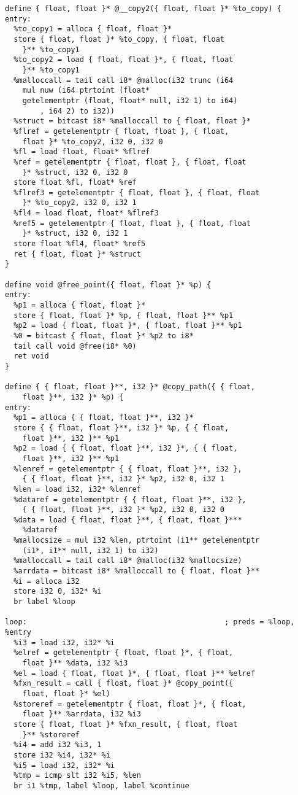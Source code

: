 \documentclass[main.tex]{subfiles}
\begin{document}
{\begin{lstlisting}
define { float, float }* @__copy2({ float, float }* %to_copy) {
entry:
  %to_copy1 = alloca { float, float }*
  store { float, float }* %to_copy, { float, float
    }** %to_copy1
  %to_copy2 = load { float, float }*, { float, float
    }** %to_copy1
  %malloccall = tail call i8* @malloc(i32 trunc (i64
    mul nuw (i64 ptrtoint (float* 
    getelementptr (float, float* null, i32 1) to i64)
        , i64 2) to i32))
  %struct = bitcast i8* %malloccall to { float, float }*
  %flref = getelementptr { float, float }, { float, 
    float }* %to_copy2, i32 0, i32 0
  %fl = load float, float* %flref
  %ref = getelementptr { float, float }, { float, float
    }* %struct, i32 0, i32 0
  store float %fl, float* %ref
  %flref3 = getelementptr { float, float }, { float, float
    }* %to_copy2, i32 0, i32 1
  %fl4 = load float, float* %flref3
  %ref5 = getelementptr { float, float }, { float, float
    }* %struct, i32 0, i32 1
  store float %fl4, float* %ref5
  ret { float, float }* %struct
}

define void @free_point({ float, float }* %p) {
entry:
  %p1 = alloca { float, float }*
  store { float, float }* %p, { float, float }** %p1
  %p2 = load { float, float }*, { float, float }** %p1
  %0 = bitcast { float, float }* %p2 to i8*
  tail call void @free(i8* %0)
  ret void
}

define { { float, float }**, i32 }* @copy_path({ { float,
    float }**, i32 }* %p) {
entry:
  %p1 = alloca { { float, float }**, i32 }*
  store { { float, float }**, i32 }* %p, { { float, 
    float }**, i32 }** %p1
  %p2 = load { { float, float }**, i32 }*, { { float,
    float }**, i32 }** %p1
  %lenref = getelementptr { { float, float }**, i32 },
    { { float, float }**, i32 }* %p2, i32 0, i32 1
  %len = load i32, i32* %lenref
  %dataref = getelementptr { { float, float }**, i32 },
    { { float, float }**, i32 }* %p2, i32 0, i32 0
  %data = load { float, float }**, { float, float }***
    %dataref
  %mallocsize = mul i32 %len, ptrtoint (i1** getelementptr
    (i1*, i1** null, i32 1) to i32)
  %malloccall = tail call i8* @malloc(i32 %mallocsize)
  %arrdata = bitcast i8* %malloccall to { float, float }**
  %i = alloca i32
  store i32 0, i32* %i
  br label %loop

loop:                                             ; preds = %loop, %entry
  %i3 = load i32, i32* %i
  %elref = getelementptr { float, float }*, { float,
    float }** %data, i32 %i3
  %el = load { float, float }*, { float, float }** %elref
  %fxn_result = call { float, float }* @copy_point({
    float, float }* %el)
  %storeref = getelementptr { float, float }*, { float,
    float }** %arrdata, i32 %i3
  store { float, float }* %fxn_result, { float, float
    }** %storeref
  %i4 = add i32 %i3, 1
  store i32 %i4, i32* %i
  %i5 = load i32, i32* %i
  %tmp = icmp slt i32 %i5, %len
  br i1 %tmp, label %loop, label %continue


\end{lstlisting}}
\end{document}
